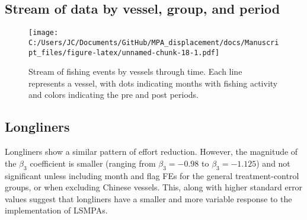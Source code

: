 \documentclass[11pt,]{article}
\begin{document}
\hypertarget{stream-of-data-by-vessel-group-and-period}{%
\subsection{Stream of data by vessel, group, and
period}\label{stream-of-data-by-vessel-group-and-period}}

\begin{figure}
\centering
\texttt{[image: C:/Users/JC/Documents/GitHub/MPA\_displacement/docs/Manuscript\_files/figure-latex/unnamed-chunk-18-1.pdf]}
\caption{\label{fig:unnamed-chunk-18}\label{fig:baci_strict}Stream of
fishing events by vessels through time. Each line represents a vessel,
with dots indicating months with fishing activity and colors indicating
the pre and post periods.}
\end{figure}

\clearpage

\hypertarget{longliners}{%
\subsection{Longliners}\label{longliners}}

Longliners show a similar pattern of effort reduction. However, the
magnitude of the \(\beta_3\) coefficient is smaller (ranging from
\(\beta_3 = -0.98\) to \(\beta_3 = -1.125\)) and not significant unless
including month and flag FEs for the general treatment-control groups,
or when excluding Chinese vessels. This, along with higher standard
error values suggest that longliners have a smaller and more variable
response to the implementation of LSMPAs.
\end{document}
